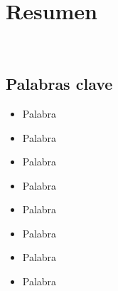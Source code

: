 \chapter*{Resumen}\label{ch:abstract-es}

\lipsum[1-3] \\

\section*{Palabras clave}\label{sec:keywords-es}
\begin{multicols}{2}
    \begin{itemize}
        \item Palabra
        \item Palabra
        \item Palabra
        \item Palabra
    \end{itemize}
    \columnbreak
    \begin{itemize}
        \item Palabra
        \item Palabra
        \item Palabra
        \item Palabra
    \end{itemize}
\end{multicols}